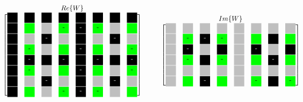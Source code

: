 \begin{frame}
\begin{minipage}{0.9\textwidth}
\begin{center}
  \[
   \stackrel{\mbox{$Re\{W\}$}}{
    \begin{bmatrix}
     \myboxOnePos 	& \myboxOnePos 		& \myboxOnePos 	& \myboxOnePos 		& \myboxOnePos 	& \myboxOnePos 		& \myboxOnePos 	& \myboxOnePos \\
     \myboxOnePos 	& \myboxSqrtPos 	& \myboxZero 	& \myboxSqrtNeg		& \myboxOneNeg	& \myboxSqrtNeg		& \myboxZero	& \myboxSqrtPos \\
     \myboxOnePos 	& \myboxZero 		& \myboxOneNeg 	& \myboxZero 		& \myboxOnePos 	& \myboxZero 		& \myboxOneNeg 	& \myboxZero \\
     \myboxOnePos 	& \myboxSqrtNeg 	& \myboxZero 	& \myboxSqrtPos 	& \myboxOneNeg 	& \myboxSqrtPos 	& \myboxZero 	& \myboxSqrtNeg \\
     \myboxOnePos 	& \myboxOneNeg 		& \myboxOnePos 	& \myboxOneNeg 		& \myboxOnePos 	& \myboxOneNeg 		& \myboxOnePos 	& \myboxOneNeg \\
     \myboxOnePos 	& \myboxSqrtNeg 	& \myboxZero 	& \myboxSqrtPos 	& \myboxOneNeg 	& \myboxSqrtPos 	& \myboxZero 	& \myboxSqrtNeg \\
     \myboxOnePos 	& \myboxZero 		& \myboxOneNeg 	& \myboxZero 		& \myboxOnePos 	& \myboxZero 		& \myboxOneNeg 	& \myboxZero \\
     \myboxOnePos 	& \myboxSqrtPos 	& \myboxZero 	& \myboxSqrtNeg		& \myboxOneNeg	& \myboxSqrtNeg		& \myboxZero	& \myboxSqrtPos 
    \end{bmatrix}
   }
   \hspace{1cm}
   \stackrel{\mbox{$Im\{W\}$}}{
    \begin{bmatrix}
     \myboxZero 	& \myboxZero 		& \myboxZero 	& \myboxZero 		& \myboxZero 	& \myboxZero 		& \myboxZero 	& \myboxZero \\
     \myboxZero 	& \myboxSqrtNeg 	& \myboxOneNeg 	& \myboxSqrtNeg		& \myboxZero	& \myboxSqrtPos		& \myboxOnePos	& \myboxSqrtPos \\
     \myboxZero 	& \myboxOneNeg 		& \myboxZero 	& \myboxOnePos 		& \myboxZero 	& \myboxOneNeg 		& \myboxZero 	& \myboxOnePos \\
     \myboxZero 	& \myboxSqrtNeg 	& \myboxOnePos 	& \myboxSqrtNeg 	& \myboxZero 	& \myboxSqrtPos 	& \myboxOneNeg 	& \myboxSqrtPos \\
     \myboxZero 	& \myboxZero 		& \myboxZero 	& \myboxZero 		& \myboxZero 	& \myboxZero 		& \myboxZero 	& \myboxZero \\
     \myboxZero 	& \myboxSqrtPos 	& \myboxOneNeg 	& \myboxSqrtPos		& \myboxZero 	& \myboxSqrtNeg 	& \myboxOnePos 	& \myboxSqrtNeg \\

\end{bmatrix}}\]
\end{center}
\end{minipage}
\end{frame}

